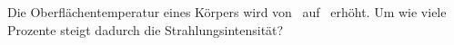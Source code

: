 Die Oberflächentemperatur eines Körpers wird von \tvO\ auf \tnO\ erhöht. Um wie viele Prozente steigt dadurch die Strahlungsintensität?
